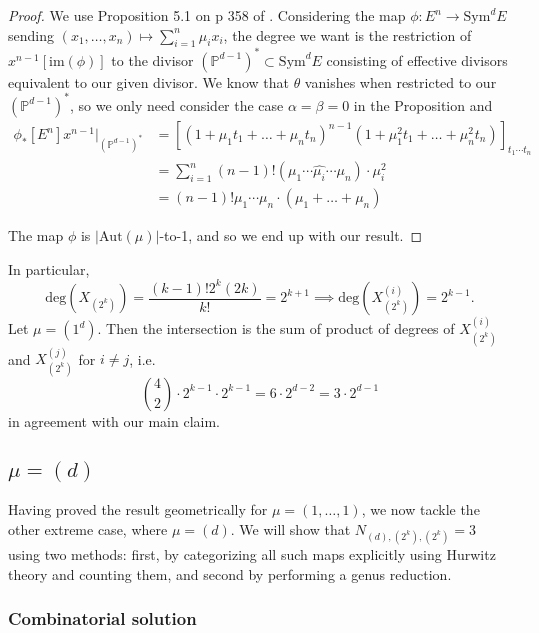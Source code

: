 \documentclass[11pt]{article}           %
\newcommand{\Aut}{\text{Aut}}
\renewcommand{\P}{\mathbb P}
\theoremstyle{definition}
\begin{document}
\begin{proof}
  We use Proposition 5.1 on p 358 of \cite{Harris}. Considering the map
  $\phi:E^n\to\text{Sym}^dE$ sending $(x_1,\dots,x_n)\mapsto \sum_{i=1}^n\mu_ix_i$,
  the degree we want is the restriction of $x^{n-1}[\text{im}(\phi)]$ to
  the divisor $(\P^{d-1})^*\subset\text{Sym}^dE$ consisting of effective divisors
  equivalent to our given divisor. We know that $\theta$ vanishes when
  restricted to our $(\P^{d-1})^*$, so we only need consider the case $\alpha=\beta=0$ in the Proposition and
  \begin{align*}
    \phi_*[E^n]x^{n-1}\bigg|_{(\P^{d-1})^*}&=[(1+\mu_1t_1+\dots+\mu_nt_n)^{n-1}(1+\mu_1^2t_1+\dots+\mu_n^2t_n)]_{t_1\cdots t_n}\\
    &=\sum_{i=1}^n(n-1)!(\mu_1\cdots\hat{\mu_i}\cdots \mu_n)\cdot\mu_i^2\\
    &=(n-1)!\mu_1\cdots\mu_n\cdot (\mu_1+\dots+\mu_n)
  \end{align*}

  
  The map $\phi$ is $|\Aut(\mu)|$-to-1, and so we end up with our result.
  \end{proof}
In particular,
\[
\text{deg}(X_{(2^k)})=\frac{(k-1)!2^k(2k)}{k!}=2^{k+1}\implies \text{deg}(X_{(2^k)}^{(i)})=2^{k-1}.
\]
Let $\mu=(1^{d})$. Then the intersection is the sum of product of degrees of $X_{(2^k)}^{(i)}$ and $X_{(2^k)}^{(j)}$ for $i\neq j$, i.e.
\[
\binom 42\cdot 2^{k-1}\cdot 2^{k-1}=6\cdot 2^{d-2}=3\cdot 2^{d-1}
\]
in agreement with our main claim.


\subsection{$\mu=(d)$}

Having proved the result geometrically for $\mu=(1,\dots,1)$, we now tackle the other extreme case, where $\mu=(d)$. We will show that $N_{(d),(2^k),(2^k)}=3$
using two methods: first, by categorizing all such maps explicitly using Hurwitz theory and counting them, and second by performing a genus reduction.

\subsubsection{Combinatorial solution}
\end{document}
